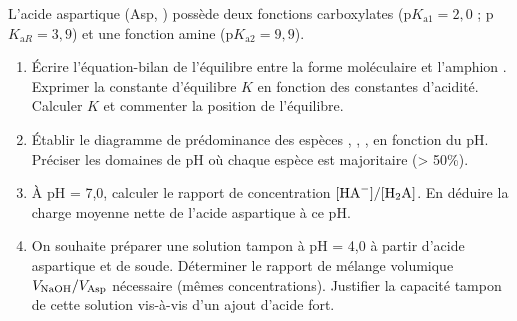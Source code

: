 \documentclass[11pt]{article}
\begin{document}
\begin{exercice}
L'acide aspartique (Asp, ) possède deux fonctions carboxylates (p$K_{\text{a}1} = 2,0$ ; p$K_{\text{a}R} = 3,9$) et une fonction amine (p$K_{\text{a}2} = 9,9$).
\begin{enumerate}
    \item Écrire l'équation-bilan de l'équilibre entre la forme moléculaire  et l'amphion . Exprimer la constante d'équilibre $K$ en fonction des constantes d'acidité. Calculer $K$ et commenter la position de l'équilibre.
    \item Établir le diagramme de prédominance des espèces , , ,  en fonction du pH. Préciser les domaines de pH où chaque espèce est majoritaire (> 50\%).
    \item À pH = 7,0, calculer le rapport de concentration $[\ce{HA-}]/[\ce{H2A}]$. En déduire la charge moyenne nette de l'acide aspartique à ce pH.
    \item On souhaite préparer une solution tampon à pH = 4,0 à partir d'acide aspartique et de soude. Déterminer le rapport de mélange volumique $V_{\ce{NaOH}}/V_{\text{Asp}}$ nécessaire (mêmes concentrations). Justifier la capacité tampon de cette solution vis-à-vis d'un ajout d'acide fort.
\end{enumerate}
\end{exercice}
\end{document}
